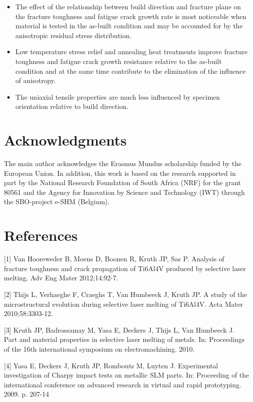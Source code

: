 \documentclass[10pt]{article}
\begin{document}
\begin{itemize}
  \item The effect of the relationship between build direction and fracture plane on the fracture toughness and fatigue crack growth rate is most noticeable when material is tested in the as-built condition and may be accounted for by the anisotropic residual stress distribution.

  \item Low temperature stress relief and annealing heat treatments improve fracture toughness and fatigue crack growth resistance relative to the as-built condition and at the same time contribute to the elimination of the influence of anisotropy.

  \item The uniaxial tensile properties are much less influenced by specimen orientation relative to build direction.

\end{itemize}

\section*{Acknowledgments}
The main author acknowledges the Erasmus Mundus scholarship funded by the European Union. In addition, this work is based on the research supported in part by the National Research Foundation of South Africa (NRF) for the grant 80561 and the Agency for Innovation by Science and Technology (IWT) through the SBO-project e-SHM (Belgium).

\section*{References}
[1] Van Hooreweder B, Moens D, Boonen R, Kruth JP, Sas P. Analysis of fracture toughness and crack propagation of Ti6Al4V produced by selective laser melting. Adv Eng Mater 2012;14:92-7.

[2] Thijs L, Verhaeghe F, Craeghs T, Van Humbeeck J, Kruth JP. A study of the microstructural evolution during selective laser melting of Ti6Al4V. Acta Mater 2010;58:3303-12.

[3] Kruth JP, Badrossamay M, Yasa E, Deckers J, Thijs L, Van Humbeeck J. Part and material properties in selective laser melting of metals. In: Proceedings of the 16th international symposium on electromachining. 2010.

[4] Yasa E, Deckers J, Kruth JP, Rombouts M, Luyten J. Experimental investigation of Charpy impact tests on metallic SLM parts. In: Proceeding of the international conference on advanced research in virtual and rapid prototyping. 2009. p. 207-14
\end{document}
